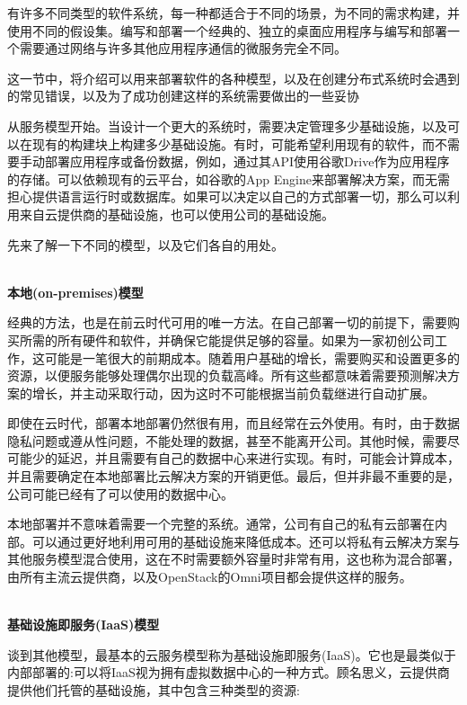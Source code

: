 
有许多不同类型的软件系统，每一种都适合于不同的场景，为不同的需求构建，并使用不同的假设集。编写和部署一个经典的、独立的桌面应用程序与编写和部署一个需要通过网络与许多其他应用程序通信的微服务完全不同。

这一节中，将介绍可以用来部署软件的各种模型，以及在创建分布式系统时会遇到的常见错误，以及为了成功创建这样的系统需要做出的一些妥协


从服务模型开始。当设计一个更大的系统时，需要决定管理多少基础设施，以及可以在现有的构建块上构建多少基础设施。有时，可能希望利用现有的软件，而不需要手动部署应用程序或备份数据，例如，通过其API使用谷歌Drive作为应用程序的存储。可以依赖现有的云平台，如谷歌的App Engine来部署解决方案，而无需担心提供语言运行时或数据库。如果可以决定以自己的方式部署一切，那么可以利用来自云提供商的基础设施，也可以使用公司的基础设施。

先来了解一下不同的模型，以及它们各自的用处。

\hspace*{\fill} \\ %
\noindent
\textbf{本地(on-premises)模型}

经典的方法，也是在前云时代可用的唯一方法。在自己部署一切的前提下，需要购买所需的所有硬件和软件，并确保它能提供足够的容量。如果为一家初创公司工作，这可能是一笔很大的前期成本。随着用户基础的增长，需要购买和设置更多的资源，以便服务能够处理偶尔出现的负载高峰。所有这些都意味着需要预测解决方案的增长，并主动采取行动，因为这时不可能根据当前负载继进行自动扩展。

即使在云时代，部署本地部署仍然很有用，而且经常在云外使用。有时，由于数据隐私问题或遵从性问题，不能处理的数据，甚至不能离开公司。其他时候，需要尽可能少的延迟，并且需要有自己的数据中心来进行实现。有时，可能会计算成本，并且需要确定在本地部署比云解决方案的开销更低。最后，但并非最不重要的是，公司可能已经有了可以使用的数据中心。

本地部署并不意味着需要一个完整的系统。通常，公司有自己的私有云部署在内部。可以通过更好地利用可用的基础设施来降低成本。还可以将私有云解决方案与其他服务模型混合使用，这在不时需要额外容量时非常有用，这也称为混合部署，由所有主流云提供商，以及OpenStack的Omni项目都会提供这样的服务。

\hspace*{\fill} \\ %
\noindent
\textbf{基础设施即服务(IaaS)模型}

谈到其他模型，最基本的云服务模型称为基础设施即服务(IaaS)。它也是最类似于内部部署的:可以将IaaS视为拥有虚拟数据中心的一种方式。顾名思义，云提供商提供他们托管的基础设施，其中包含三种类型的资源:

